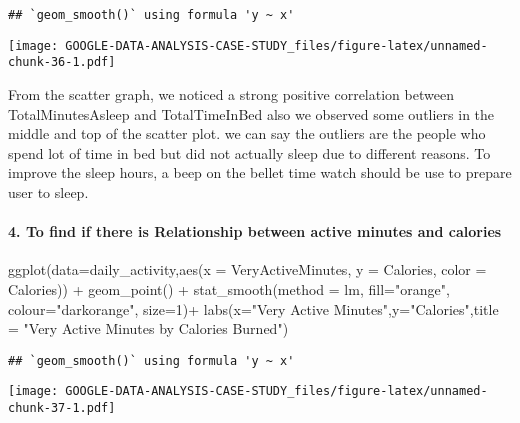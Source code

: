 \documentclass[
]{article}
\newenvironment{Shaded}{\begin{snugshade}}{\end{snugshade}}
\newcommand{\AttributeTok}[1]{\textcolor[rgb]{0.77,0.63,0.00}{#1}}
\newcommand{\DecValTok}[1]{\textcolor[rgb]{0.00,0.00,0.81}{#1}}
\newcommand{\FunctionTok}[1]{\textcolor[rgb]{0.00,0.00,0.00}{#1}}
\newcommand{\NormalTok}[1]{#1}
\newcommand{\SpecialCharTok}[1]{\textcolor[rgb]{0.00,0.00,0.00}{#1}}
\newcommand{\StringTok}[1]{\textcolor[rgb]{0.31,0.60,0.02}{#1}}
\begin{document}
\begin{verbatim}
## `geom_smooth()` using formula 'y ~ x'
\end{verbatim}

\texttt{[image: GOOGLE-DATA-ANALYSIS-CASE-STUDY\_files/figure-latex/unnamed-chunk-36-1.pdf]}

From the scatter graph, we noticed a strong positive correlation between
TotalMinutesAsleep and TotalTimeInBed also we observed some outliers in
the middle and top of the scatter plot. we can say the outliers are the
people who spend lot of time in bed but did not actually sleep due to
different reasons. To improve the sleep hours, a beep on the bellet time
watch should be use to prepare user to sleep.

\hypertarget{to-find-if-there-is-relationship-between-active-minutes-and-calories}{%
\paragraph{4. To find if there is Relationship between active minutes
and
calories}\label{to-find-if-there-is-relationship-between-active-minutes-and-calories}}

\begin{Shaded}
\begin{Highlighting}[]
\FunctionTok{ggplot}\NormalTok{(}\AttributeTok{data=}\NormalTok{daily\_activity,}\FunctionTok{aes}\NormalTok{(}\AttributeTok{x =}\NormalTok{ VeryActiveMinutes, }\AttributeTok{y =}\NormalTok{ Calories, }\AttributeTok{color =}\NormalTok{ Calories)) }\SpecialCharTok{+} \FunctionTok{geom\_point}\NormalTok{() }\SpecialCharTok{+} \FunctionTok{stat\_smooth}\NormalTok{(}\AttributeTok{method =}\NormalTok{ lm,  }\AttributeTok{fill=}\StringTok{"orange"}\NormalTok{, }\AttributeTok{colour=}\StringTok{"darkorange"}\NormalTok{, }\AttributeTok{size=}\DecValTok{1}\NormalTok{)}\SpecialCharTok{+}
\FunctionTok{labs}\NormalTok{(}\AttributeTok{x=}\StringTok{"Very Active Minutes"}\NormalTok{,}\AttributeTok{y=}\StringTok{"Calories"}\NormalTok{,}\AttributeTok{title =} \StringTok{"Very Active Minutes by Calories Burned"}\NormalTok{)}
\end{Highlighting}
\end{Shaded}

\begin{verbatim}
## `geom_smooth()` using formula 'y ~ x'
\end{verbatim}

\texttt{[image: GOOGLE-DATA-ANALYSIS-CASE-STUDY\_files/figure-latex/unnamed-chunk-37-1.pdf]}
\end{document}
